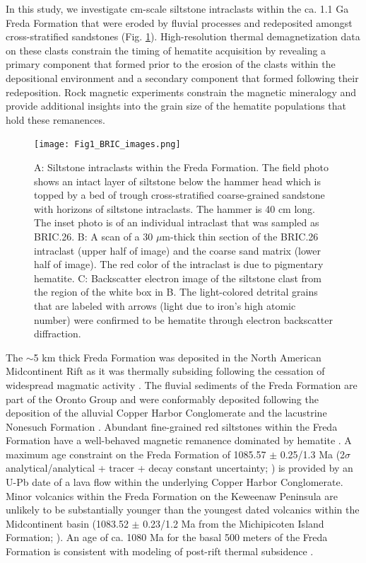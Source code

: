 \documentclass[draft]{agujournal2019}
\begin{document}
In this study, we investigate cm-scale siltstone intraclasts within the ca. 1.1 Ga Freda Formation that were eroded by fluvial processes and redeposited amongst cross-stratified sandstones (Fig. \ref{fig:intraclast_images}). High-resolution thermal demagnetization data on these clasts constrain the timing of hematite acquisition by revealing a primary component that formed prior to the erosion of the clasts within the depositional environment and a secondary component that formed following their redeposition. Rock magnetic experiments constrain the magnetic mineralogy and provide additional insights into the grain size of the hematite populations that hold these remanences.

\begin{figure}[!ht]
\centering
\noindent\texttt{[image: Fig1\_BRIC\_images.png]}
\caption{\small{A: Siltstone intraclasts within the Freda Formation. The field photo shows an intact layer of siltstone below the hammer head which is topped by a bed of trough cross-stratified coarse-grained sandstone with horizons of siltstone intraclasts. The hammer is 40 cm long. The inset photo is of an individual intraclast that was sampled as BRIC.26. B: A scan of a 30 $\mu$m-thick thin section of the BRIC.26 intraclast (upper half of image) and the coarse sand matrix (lower half of image). The red color of the intraclast is due to pigmentary hematite. C: Backscatter electron image of the siltstone clast from the region of the white box in B. The light-colored detrital grains that are labeled with arrows (light due to iron's high atomic number) were confirmed to be hematite through electron backscatter diffraction.}}
\label{fig:intraclast_images}
\end{figure}

The $\sim$5 km thick Freda Formation was deposited in the North American Midcontinent Rift as it was thermally subsiding following the cessation of widespread magmatic activity \cite{Cannon1992b}. The fluvial sediments of the Freda Formation are part of the Oronto Group and were conformably deposited following the deposition of the alluvial Copper Harbor Conglomerate and the lacustrine Nonesuch Formation \cite{Ojakangas2001a, Slotznick2018b}.  Abundant fine-grained red siltstones within the Freda Formation have a well-behaved magnetic remanence dominated by hematite \cite{Henry1977a}. A maximum age constraint on the Freda Formation of 1085.57 $\pm$ 0.25/1.3 Ma (2$\sigma$ analytical/analytical + tracer + decay constant uncertainty; \cite{Fairchild2017a}) is provided by an U-Pb date of a lava flow within the underlying Copper Harbor Conglomerate. Minor volcanics within the Freda Formation on the Keweenaw Peninsula are unlikely to be substantially younger than the youngest dated volcanics within the Midcontinent basin (1083.52 $\pm$ 0.23/1.2 Ma from the Michipicoten Island Formation; \cite{Fairchild2017a}). An age of ca. 1080 Ma for the basal 500 meters of the Freda Formation is consistent with modeling of post-rift thermal subsidence \cite{Hutchinson1990a}.
\end{document}
